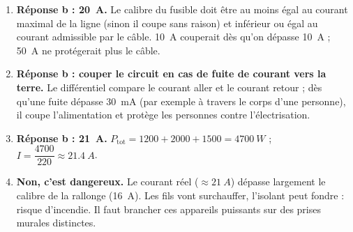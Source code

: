 \documentclass[11pt]{article}
\begin{document}
\begin{corrige}
\begin{enumerate}
\item \textbf{Réponse b : \SI{20}{A}.} Le calibre du fusible doit être au moins égal au courant maximal de la ligne (sinon il coupe sans raison) et inférieur ou égal au courant admissible par le câble. \SI{10}{A} couperait dès qu'on dépasse \SI{10}{A} ; \SI{50}{A} ne protégerait plus le câble.
\item \textbf{Réponse b : couper le circuit en cas de fuite de courant vers la terre.} Le différentiel compare le courant aller et le courant retour ; dès qu'une fuite dépasse \SI{30}{mA} (par exemple à travers le corps d'une personne), il coupe l'alimentation et protège les personnes contre l'électrisation.
\item \textbf{Réponse b : \SI{21}{A}.} $P_{\text{tot}} = 1200 + 2000 + 1500 = \SI{4700}{W}$ ; $I = \dfrac{4700}{220} \approx \SI{21,4}{A}$.
\item \textbf{Non, c'est dangereux.} Le courant réel ($\approx \SI{21}{A}$) dépasse largement le calibre de la rallonge (\SI{16}{A}). Les fils vont surchauffer, l'isolant peut fondre : risque d'incendie. Il faut brancher ces appareils puissants sur des prises murales distinctes.
\end{enumerate}
\end{corrige}
\end{document}
